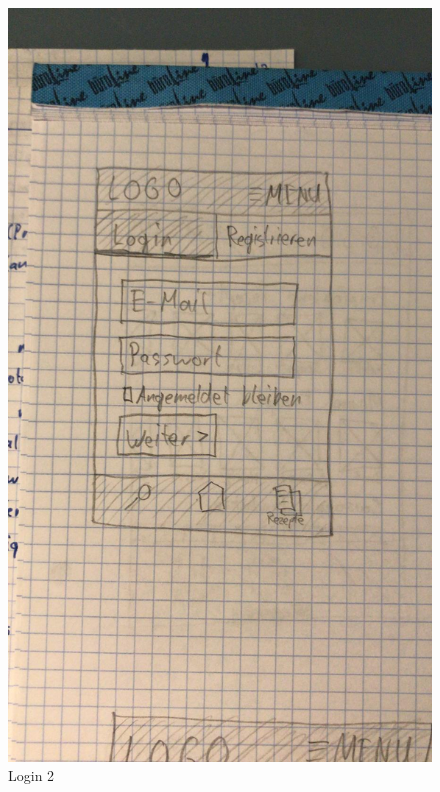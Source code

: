 \begin{figure}[H]
  \includegraphics[width=\linewidth]{./exercise13/Login2.jpeg}
  \caption{Login 2}
\end{figure}

